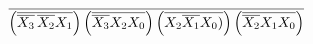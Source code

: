 \documentclass[preview]{standalone}
\begin{document}
\begin{align*}
\overline{\left(\overline{\overline{X_3}\nobreak\hspace{.16667em plus .08333em}\overline{X_2}X_1}\right)\left(\overline{\overline{X_3}X_2X_0}\right)\left(\overline{X_2\overline{X_1}X_0)}\right)\left(\overline{\overline{X_2}X_1X_0}\right)}
\end{align*}
\end{document}
